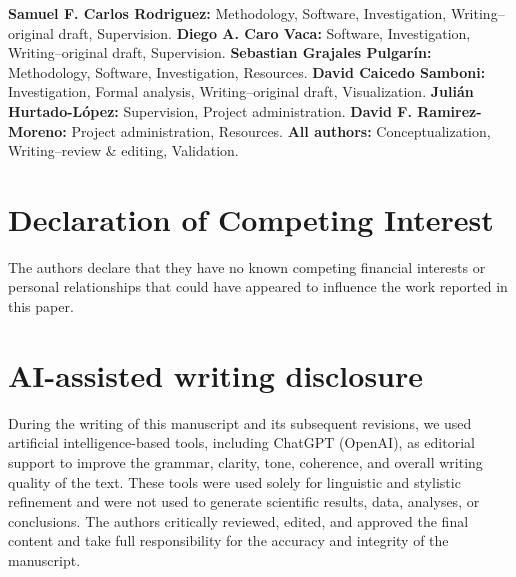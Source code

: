 \documentclass[preprint,12pt]{elsarticle}
\begin{document}
\textbf{Samuel F. Carlos Rodriguez:} Methodology, Software, Investigation, Writing--original draft, Supervision.
\textbf{Diego A. Caro Vaca:} Software, Investigation, Writing--original draft, Supervision.
\textbf{Sebastian Grajales Pulgarín:} Methodology, Software, Investigation, Resources.
\textbf{David Caicedo Samboni:} Investigation, Formal analysis, Writing--original draft, Visualization.
\textbf{Julián Hurtado-López:} Supervision, Project administration.
\textbf{David F. Ramirez-Moreno:} Project administration, Resources.
\textbf{All authors:} Conceptualization, Writing--review \& editing, Validation.

\section*{Declaration of Competing Interest}

The authors declare that they have no known competing financial interests or personal relationships that could have appeared to influence the work reported in this paper.

\section*{AI-assisted writing disclosure}

During the writing of this manuscript and its subsequent revisions, we used artificial intelligence-based tools, including ChatGPT (OpenAI), as editorial support to improve the grammar, clarity, tone, coherence, and overall writing quality of the text. These tools were used solely for linguistic and stylistic refinement and were not used to generate scientific results, data, analyses, or conclusions. The authors critically reviewed, edited, and approved the final content and take full responsibility for the accuracy and integrity of the manuscript.


 




%



\end{document}
